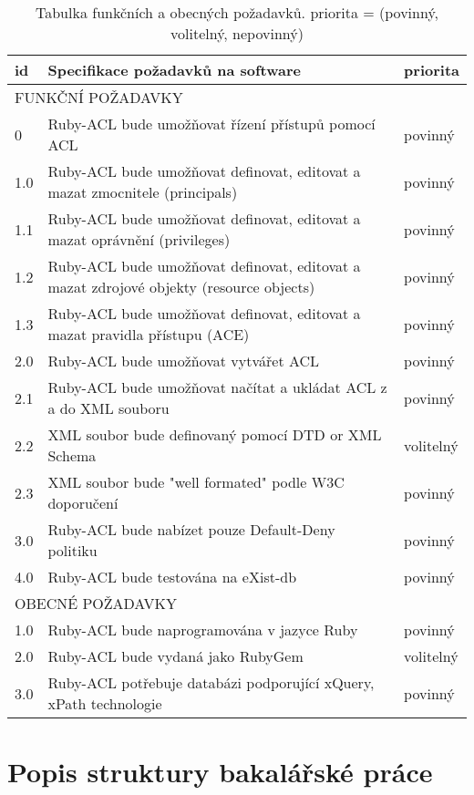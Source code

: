 \begin{table}%
\begin{center}
\begin{tabular}{|l|p{9cm}|l|}
\hline
\textbf{id} & \textbf{Specifikace požadavků na software} & \textbf{priorita} \\
\hline
\multicolumn{3}{|l|}{FUNKČNÍ POŽADAVKY} \\
\hline
0 & Ruby-ACL bude umožňovat řízení přístupů pomocí ACL & povinný\\
\hline
1.0 & Ruby-ACL bude umožňovat definovat, editovat a mazat zmocnitele (principals) & povinný\\
\hline
1.1 & Ruby-ACL bude umožňovat definovat, editovat a mazat oprávnění (privileges) & povinný\\
\hline
1.2 & Ruby-ACL bude umožňovat definovat, editovat a mazat  zdrojové objekty (resource objects) & povinný\\
\hline
1.3 & Ruby-ACL bude umožňovat definovat, editovat a mazat pravidla přístupu (ACE) & povinný\\
\hline
2.0 & Ruby-ACL bude umožňovat vytvářet ACL & povinný\\
\hline
2.1 & Ruby-ACL bude umožňovat načítat a ukládat ACL z a do XML souboru & povinný\\
\hline
2.2 & XML soubor bude definovaný pomocí DTD or XML Schema & volitelný\\
\hline
2.3 & XML soubor bude "well formated" podle W3C doporučení & povinný\\
\hline
3.0 & Ruby-ACL bude nabízet pouze Default-Deny politiku & povinný\\
\hline
4.0 & Ruby-ACL bude testována na eXist-db & povinný\\
\hline
\multicolumn{3}{|l|}{OBECNÉ POŽADAVKY} \\
\hline
1.0 & Ruby-ACL bude naprogramována v jazyce Ruby & povinný \\
\hline
2.0 & Ruby-ACL bude vydaná jako RubyGem & volitelný\\
\hline
3.0 & Ruby-ACL potřebuje databázi podporující xQuery, xPath technologie & povinný\\
\hline
\end{tabular}
\end{center}
\caption{Tabulka funkčních a obecných požadavků. priorita = (povinný, volitelný, nepovinný)}
\label{tab:tab1}
\end{table}

\section{Popis struktury bakalářské práce}

